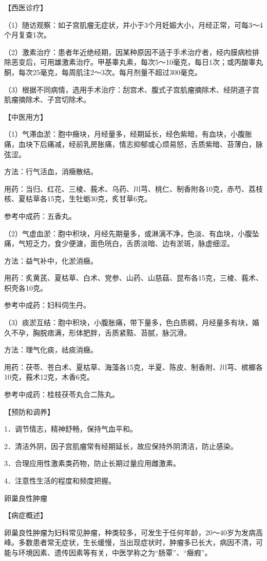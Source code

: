 \documentclass[12pt,UTF8]{ctexbook}
\begin{document}
【西医诊疗】

（1）随访观察：如子宫肌瘤无症状，并小于3个月妊娠大小，月经正常，可每3～4个月复查1次。

（2）激素治疗：患者年近绝经期，因某种原因不适于手术治疗者，经内膜病检排除恶变后，可用雄激素治疗。甲基睾丸素，每次5～10毫克，每日1次；或丙酸睾丸酮，每次25毫克，每周肌注2～3次。每月剂量不超过300毫克。

（3）根据不同病情，选用手术治疗：刮宫术、腹式子宫肌瘤摘除术、经阴道子宫肌瘤摘除术、子宫切除术。

【中医用方】

（1）气滞血淤：胞中癥块，月经量多，经期延长，经色紫暗，有血块，小腹胀痛，血块下后痛减，经前乳房胀痛，情志抑郁或心烦易怒，舌质紫暗、苔薄白，脉弦涩。

方法：行气活血，消癥散结。

用药：当归、红花、三棱、莪术、乌药、川芎、桃仁、制香附各10克，赤芍、荔枝核、夏枯草各15克，生牡蛎30克，炙甘草6克。

参考中成药：五香丸。

（2）气虚血淤：胞中积块，月经先期量多，或淋漓不净，色淡、有血块，小腹坠痛，气短乏力，食少便溏，面色咣白，舌质淡暗、边有淤斑，脉虚细涩。

方法：益气补中，化淤消癥。

用药：炙黄芪、夏枯草、白术、党参、山药、山慈菇、昆布各15克，三棱、莪术、枳壳各10克。

参考中成药：妇科伺生丹。

（3）痰淤互结：胞中积块，小腹胀痛，带下量多，色白质稠，月经量多有块，婚久不孕，胸脘痞满，形体肥胖，舌质紧黠、苔腻，脉沉滑。

方法：理气化痰，祛痰消癥。

用药：茯苓、苍白术、夏枯草、海藻各15克，半夏、陈皮、制香附、川芎、槟榔各10克，莪术12克，木香6克。

参考中成药：桂枝茯苓丸合二陈丸。

【预防和调养】

1．调节情志，精神舒畅，保持气血平和。

2．清洁外阴，因子宫肌瘤常有经期延长，故应保持外阴清洁，防止感染。

3．合理应用性激素类药物，防止长期过量应用雌激素。

4．注意性生活的程度和频度把握。





卵巢良性肿瘤


【病症概述】

卵巢良性肿瘤为妇科常见肿瘤，种类较多，可发生于任何年龄，20～40岁为发病高峰。多数患者常无症状，生长缓慢，当出现症状时，肿瘤多已长大，病因不清，可能与环境因素、遗传因素等有关，中医学称之为“肠覃”、“癥瘕”。
\end{document}
